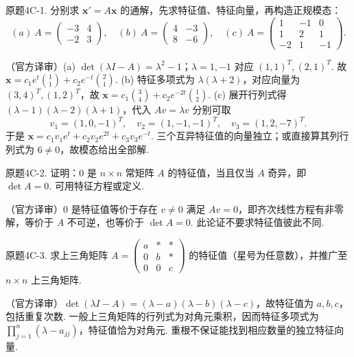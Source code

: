\begin{exercise}\label{cw:bank-4C-1}原题4C-1. 分别求 $\mathbf x'=A\mathbf x$ 的通解，先求特征值、特征向量，再构造正规模态：
\[(a)\ A=\begin{pmatrix}-3&4\\-2&3\end{pmatrix},\quad
(b)\ A=\begin{pmatrix}4&-3\\8&-6\end{pmatrix},\quad
(c)\ A=\begin{pmatrix}1&-1&0\\1&2&1\\-2&1&-1\end{pmatrix}.\]
\end{exercise}
\begin{solution}（官方译审）(a) $\det(\lambda I-A)=\lambda^2-1$；$\lambda=1,-1$ 对应 $(1,1)^T,(2,1)^T$. 故 $\mathbf x=c_1e^t\binom11+c_2e^{-t}\binom21$. (b) 特征多项式为 $\lambda(\lambda+2)$，对应向量为 $(3,4)^T,(1,2)^T$，故 $\mathbf x=c_1\binom34+c_2e^{-2t}\binom12$. (c) 展开行列式得 $(\lambda-1)(\lambda-2)(\lambda+1)$，代入 $Av=\lambda v$ 分别可取
\[v_1=(1,0,-1)^T,\quad v_2=(1,-1,-1)^T,\quad v_3=(1,2,-7)^T.\]
于是 $\mathbf x=c_1v_1e^t+c_2v_2e^{2t}+c_3v_3e^{-t}$. 三个互异特征值的向量独立；或直接算其列行列式为 $6\ne0$，故模态给出全部解.\end{solution}
\begin{exercise}\label{cw:bank-4C-2}原题4C-2. 证明：$0$ 是 $n\times n$ 常矩阵 $A$ 的特征值，当且仅当 $A$ 奇异，即 $\det A=0$. 可用特征方程或定义.\end{exercise}
\begin{solution}（官方译审）$0$ 是特征值等价于存在 $v\ne0$ 满足 $Av=0$，即齐次线性方程有非零解，等价于 $A$ 不可逆，也等价于 $\det A=0$. 此论证不要求特征值彼此不同.\end{solution}
\begin{exercise}\label{cw:bank-4C-3}原题4C-3. 求上三角矩阵 $A=\begin{pmatrix}a&*&*\\0&b&*\\0&0&c\end{pmatrix}$ 的特征值（星号为任意数），并推广至 $n\times n$ 上三角矩阵.\end{exercise}
\begin{solution}（官方译审）$\det(\lambda I-A)=(\lambda-a)(\lambda-b)(\lambda-c)$，故特征值为 $a,b,c$，包括重复次数. 一般上三角矩阵的行列式为对角元乘积，因而特征多项式为 $\prod_{j=1}^n(\lambda-a_{jj})$，特征值恰为对角元. 重根不保证能找到相应数量的独立特征向量.\end{solution}
